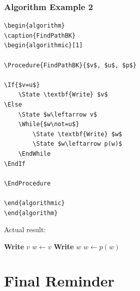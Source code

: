 \documentclass[a4paper,10pt]{article}
\begin{document}

\subsubsection{Algorithm Example 2}

\begin{verbatim}
\begin{algorithm}
\caption{FindPathBK}
\begin{algorithmic}[1]

\Procedure{FindPathBK}{$v$, $u$, $p$}

\If{$v=u$}
    \State \textbf{Write} $v$
\Else
    \State $w\leftarrow v$
    \While{$w\not=u$}
        \State \textbf{Write} $w$
        \State $w\leftarrow p(w)$
    \EndWhile
\EndIf

\EndProcedure

\end{algorithmic}
\end{algorithm}
\end{verbatim}

Actual result:

\begin{algorithm}
\caption{FindPathBK}
\begin{algorithmic}[1]


    \State \textbf{Write} $v$
\Else
    \State $w\leftarrow v$
        \State \textbf{Write} $w$
        \State $w\leftarrow p(w)$
    \EndWhile
\EndIf

\EndProcedure

\end{algorithmic}
\end{algorithm}


\section{Final Reminder}
\end{document}
